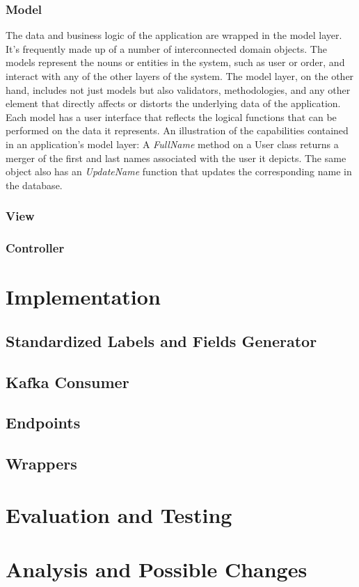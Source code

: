 \subsubsection{Model}
The data and business logic of the application are wrapped in the model layer.
It's frequently made up of a number of interconnected domain objects.
The models represent the nouns or entities in the system, such as user or order, and interact with any of the other layers of the system.  
\newline The model layer, on the other hand, includes not just models but also validators, methodologies, and any other element that directly affects or distorts the underlying data of the application. \newline \\ 
Each model has a user interface that reflects the logical functions that can be performed on the data it represents.
An illustration of the capabilities contained in an application's model layer: A \textit{FullName} method on a User class returns a merger of the first and last names associated with the user it depicts. The same object also has an \textit{UpdateName} function that updates the corresponding name in the database.

\subsubsection{View}
\subsubsection{Controller}

\section{Implementation}
\subsection{Standardized Labels and Fields Generator}
\subsection{Kafka Consumer}
\subsection{Endpoints}
\subsection{Wrappers}

\section{Evaluation and Testing}
\section{Analysis and Possible Changes}
